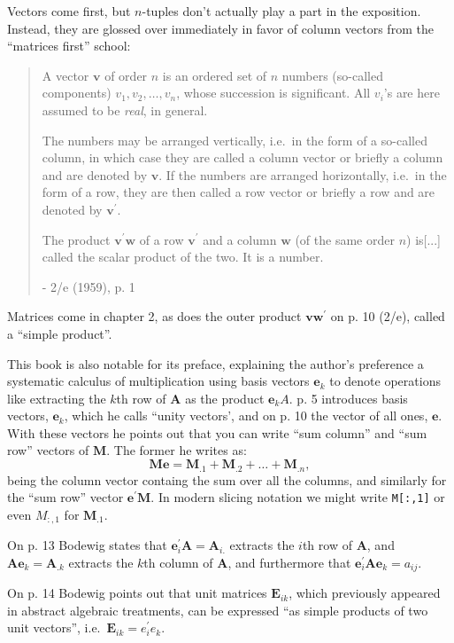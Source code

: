 Vectors come first, but $n$-tuples don't actually play a part in the exposition.
Instead, they are glossed over immediately in favor of column vectors from the
``matrices first'' school:

\begin{quote}
A vector $\mathbf v$ of order $n$ is an ordered set of $n$ numbers (so-called
components) $v_1, v_2, \dots, v_n$, whose succession is significant. All $v_i$'s are here
assumed to be \textit{real}, in general.

The numbers may be arranged vertically, i.e.\ in the form of a so-called
column, in which case they are called a column vector or briefly a
column and are denoted by $\mathbf v$. If the numbers are arranged horizontally,
i.e.\ in the form of a row, they are then called a row vector or briefly a
row and are denoted by $\mathbf v^\prime$.

The product $\mathbf v^\prime \mathbf w$ of a row $\mathbf v^\prime$ and a column
$\mathbf w$ (of the same order $n$) is[...] called the scalar product of the two. It is a number.

- 2/e (1959), p. 1
\end{quote}

Matrices come in chapter 2, as does the outer product $\mathbf v \mathbf w^\prime$
on p. 10 (2/e), called a ``simple product''.

This book is also notable for its preface, explaining the author's preference a
systematic calculus of multiplication using basis vectors $\mathbf e_k$ to denote
operations like extracting the $k$th row of $\mathbf A$ as the product $\mathbf e_k A$.
p. 5 introduces basis vectors, $\mathbf e_k$, which he calls ``unity vectors',
and on p. 10 the vector of all ones, $\mathbf e$. With these vectors he points
out that you can write ``sum column'' and ``sum row'' vectors of $\mathbf M$. The
former he writes as:
\[
\mathbf{Me} = \mathbf M_{.1} + \mathbf M_{.2} + \dots + \mathbf M_{.n},
\]
being the column vector containg the sum over all the columns, and similarly for
the ``sum row'' vector $\mathbf{e^\prime M}$. In modern slicing notation we might
write \verb|M[:,1]| or even $M_{:,1}$ for $\mathbf M_{.1}$.

On p. 13 Bodewig states that $\mathbf e^\prime_i \mathbf A = \mathbf A_{i.}$
extracts the $i$th row of $\mathbf A$, and $\mathbf A \mathbf e_k = \mathbf A_{.k}$
extracts the $k$th column of $\mathbf A$, and furthermore that
$\mathbf e^\prime_i \mathbf A \mathbf e_k = a_{ij}$.

On p. 14 Bodewig points out that unit matrices $\mathbf E_{ik}$, which previously
appeared in abstract algebraic treatments, can be expressed ``as simple products
of two unit vectors'', i.e.\ $\mathbf E_{ik} = e^\prime_i e_k$.


